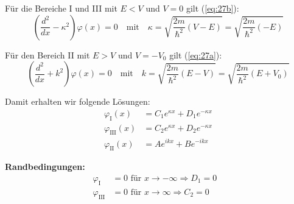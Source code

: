 Für die Bereiche I und III mit $E < V$ und $V=0$ gilt (\ref{eq:27b}):
\begin{equation}
  \left(\frac{d^2}{dx}-\kappa^2\right)\varphi(x)=0
   \quad\text{mit} \quad
  \kappa=\sqrt{\frac{2m}{\hbar^2}(V-E)}
      =\sqrt{\frac{2m}{\hbar^2}(-E)}\label{eq:56}
\end{equation}

Für den Bereich II mit $E > V$ und $V=-V_0$ gilt (\ref{eq:27a}):
\begin{equation}
  \left(\frac{d^2}{dx}+k^2\right)\varphi(x)=0
  \quad \text{mit} \quad
  k=\sqrt{\frac{2m}{\hbar^2}(E-V)}
   =\sqrt{\frac{2m}{\hbar^2}(E+V_0)}\label{eq:57}
\end{equation}

Damit erhalten wir folgende Lösungen:
\begin{align*}
  \varphi_\text{I}(x)&= C_1 e^{\kappa x}+D_1 e^{-\kappa x} \\
  \varphi_\text{III}(x)&= C_2 e^{\kappa x}+D_2 e^{-\kappa x}\\
   \varphi_\text{II}(x)&= A e^{i k x}+B e^{-i k x}
\end{align*}

\textbf{Randbedingungen:}
\begin{align*}
  \varphi_\text{I} &= 0 \text{ für } x \rightarrow -\infty \Rightarrow D_1=0&\\
  \varphi_\text{III} &= 0 \text{ für } x \rightarrow \infty \Rightarrow C_2=0&\\
\end{align*}


